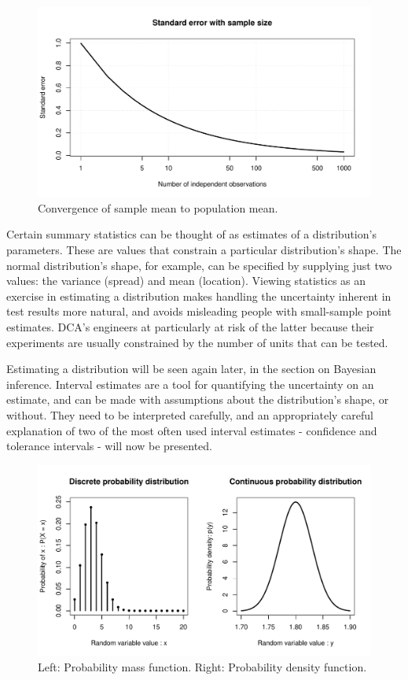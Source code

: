 \documentclass[11pt,a4paper,article]{memoir} %
\begin{document}
\begin{figure}[h]
\includegraphics[width=\textwidth]{se_with_sample_size.pdf}
\caption{Convergence of sample mean to population mean.}
\label{fig:se_with_sample_size}
\end{figure}

Certain summary statistics can be thought of as estimates of a distribution's parameters. These are values that constrain a particular distribution's shape. The normal distribution's shape, for example, can be specified by supplying just two values: the variance (spread) and mean (location). Viewing statistics as an exercise in estimating a distribution makes handling the uncertainty inherent in test results more natural, and avoids misleading people with small-sample point estimates. DCA's engineers at particularly at risk of the latter because their experiments are usually constrained by the number of units that can be tested.

 Estimating a distribution will be seen again later, in the section on Bayesian inference. Interval estimates are a tool for quantifying the uncertainty on an estimate, and can be made with assumptions about the distribution's shape, or without. They need to be interpreted carefully, and an appropriately careful explanation of two of the most often used interval estimates - confidence and tolerance intervals - will now be presented.

\begin{figure}
\includegraphics[width=\textwidth]{probability_distributions.pdf}
\caption{Left: Probability mass function. Right: Probability density function.}
\label{fig:example_pd}
\end{figure}
\par
\end{document}
